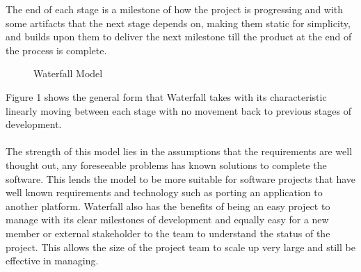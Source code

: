 \documentclass{style/CRPITStyle}
\begin{document}
The end of each stage is a milestone of how the project is progressing and with some artifacts
that the next stage depends on, making them static for simplicity, and builds upon
them to deliver the next milestone till the product at the end of the process is
complete.

\vspace{.1in}

\begin{figure}[htb]
\caption{\protect\label{waterfall}  Waterfall Model}
\end{figure}

\vspace{.1in}

Figure 1 shows the general form that Waterfall takes with its characteristic 
linearly moving between each stage with no movement back to previous stages of
development.

\paragraph{}

The strength of this model lies in the assumptions that the requirements are
well thought out, any foreseeable problems has known solutions to complete the
software.
This lends the model to be more suitable for software projects that have well known
requirements and technology such as porting an application to another platform.
Waterfall also has the benefits of being an easy project to manage with its
clear milestones of development and equally easy for a new member or external
stakeholder to the team to understand the status of the project.
This allows the size of the project team to scale up very large and still be
effective in managing.

\paragraph{}
\end{document}
